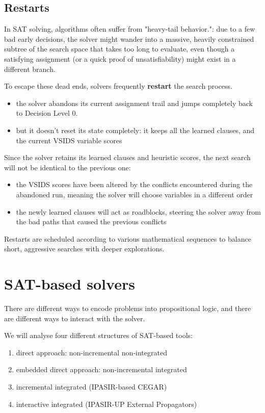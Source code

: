 \documentclass[a4paper, 11pt]{report}
\begin{document}
\subsection{Restarts}
In SAT solving, algorithms often suffer from "heavy-tail behavior.": due to a few bad early decisions, the solver might wander into a massive, heavily constrained subtree of the search space that takes too long to evaluate, even though a satisfying assignment (or a quick proof of unsatisfiability) might exist in a different branch.

To escape these dead ends, solvers frequently \textbf{restart} the search process.
\begin{itemize}
    \item the solver abandons its current assignment trail and jumps completely back to Decision Level 0.
    \item but it doesn't reset its state completely: it keeps all the learned clauses, and the current VSIDS variable scores
\end{itemize}

Since the solver retains its learned clauses and heuristic scores, the next search will not be identical to the previous one:
\begin{itemize}
    \item the VSIDS scores have been altered by the conflicts encountered during the abandoned run, meaning the solver will choose variables in a different order
    \item the newly learned clauses will act as roadblocks, steering the solver away from the bad paths that caused the previous conflicts
\end{itemize}

Restarts are scheduled according to various mathematical sequences to balance short, aggressive searches with deeper explorations.

\section{SAT-based solvers}
There are different ways to encode problems into propositional logic, and there are different ways to interact with the solver.

We will analyse four different structures of SAT-based tools:
\begin{enumerate}
    \item direct approach: non-incremental non-integrated
    \item embedded direct approach: non-incremental integrated
    \item incremental integrated (IPASIR-based CEGAR)
    \item interactive integrated (IPASIR-UP External Propagators)
\end{enumerate}
\end{document}
